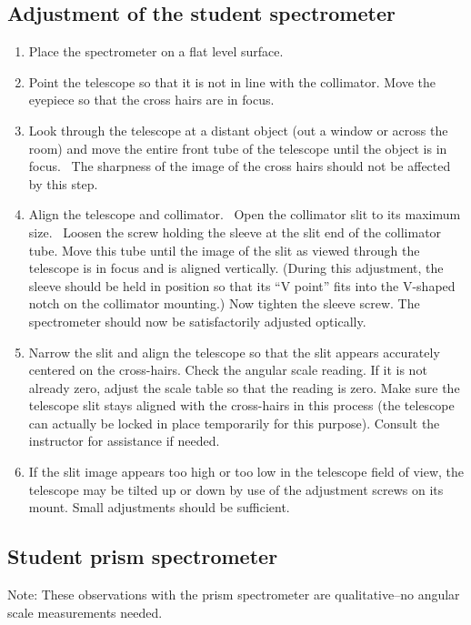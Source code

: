 \subsection{Adjustment of the student spectrometer}
\begin{enumerate}
\item Place the spectrometer on a flat level surface.
\item Point the telescope so that it is not in line with the collimator.
Move the eyepiece so that the cross hairs are in focus.
\item Look through the telescope at a distant object (out a window or
across the room) and move the entire front tube of the telescope until
the object is in focus. \ The sharpness of the image of the cross hairs
should not be affected by this step.
\item Align the telescope and collimator. \ Open the collimator slit to
its maximum size. \ Loosen the screw holding the sleeve at the slit end
of the  collimator tube. Move this tube until the image of the slit as
viewed  through the telescope is in focus and is aligned vertically.
(During this adjustment, the sleeve should be held in position so that
its ``V point'' fits into the V-shaped notch
on the collimator mounting.)  Now tighten the sleeve screw. The
spectrometer should now be satisfactorily adjusted optically.
\item Narrow the slit and align the telescope so that the slit appears
accurately centered on the cross-hairs.  Check the angular scale
reading.
If it is not already zero, adjust the scale table so that the reading is
zero.  Make sure the telescope slit stays aligned with the cross-hairs
in this process (the telescope can actually be locked in place
temporarily for this purpose). Consult the instructor for assistance if
needed.
\item If the slit image appears too high or too low in the telescope
field of view, the telescope may be tilted up or down by use of the
adjustment screws on its mount.  Small adjustments should be
sufficient.
\end{enumerate}

\subsection{Student prism spectrometer}
Note: These observations with the prism spectrometer are
qualitative--no angular scale measurements needed.

